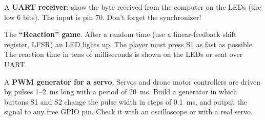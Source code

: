 \begin{taskbox}
A \textbf{UART receiver}: show the byte received from the computer on the
LEDs (the low 6 bits). The input is pin 70. Don't forget the synchronizer!
\end{taskbox}

\begin{taskbox}
The \textbf{``Reaction'' game}. After a random time (use a
linear-feedback shift register, LFSR) an LED lights up.
The player must press S1 as fast as possible. The reaction time in tens of
milliseconds is shown on the LEDs or sent over UART.
\end{taskbox}

\begin{taskbox}
A \textbf{PWM generator for a servo}. Servos and drone motor controllers
are driven by pulses 1--2~ms long with a period of 20~ms.
Build a generator in which buttons S1 and S2 change the pulse width in
steps of 0.1~ms, and output the signal to any free GPIO pin. Check it
with an oscilloscope or with a real servo.
\end{taskbox}


